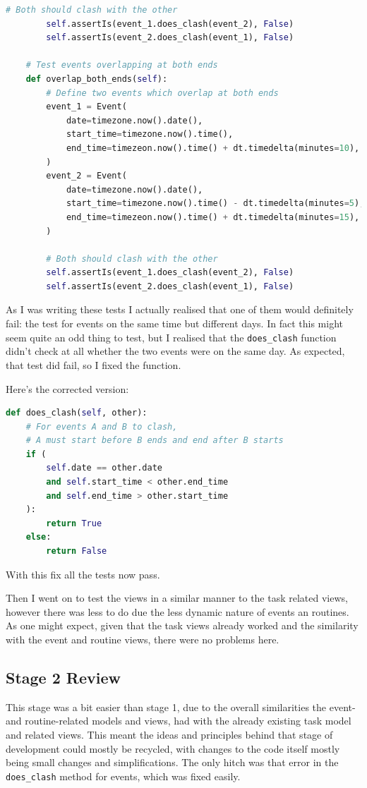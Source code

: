 \documentclass{article}
\begin{document}
\begin{lstlisting}[language=Python]
        # Both should clash with the other
        self.assertIs(event_1.does_clash(event_2), False)
        self.assertIs(event_2.does_clash(event_1), False)

    # Test events overlapping at both ends
    def overlap_both_ends(self):
        # Define two events which overlap at both ends
        event_1 = Event(
            date=timezone.now().date(),
            start_time=timezone.now().time(),
            end_time=timezeon.now().time() + dt.timedelta(minutes=10),
        )
        event_2 = Event(
            date=timezone.now().date(),
            start_time=timezone.now().time() - dt.timedelta(minutes=5),
            end_time=timezeon.now().time() + dt.timedelta(minutes=15),
        )

        # Both should clash with the other
        self.assertIs(event_1.does_clash(event_2), False)
        self.assertIs(event_2.does_clash(event_1), False)
\end{lstlisting}

As I was writing these tests I actually realised that one of them would definitely fail:
the test for events on the same time but different days.
In fact this might seem quite an odd thing to test,
but I realised that the \texttt{does\_clash} function didn't check at all whether the two events were on the same day.
As expected, that test did fail,
so I fixed the function.

Here's the corrected version:
\begin{lstlisting}[language=Python]
def does_clash(self, other):
    # For events A and B to clash,
    # A must start before B ends and end after B starts
    if (
        self.date == other.date
        and self.start_time < other.end_time
        and self.end_time > other.start_time
    ):
        return True
    else:
        return False
\end{lstlisting}

With this fix all the tests now pass.

Then I went on to test the views in a similar manner to the task related views,
however there was less to do due the less dynamic nature of events an routines.
As one might expect,
given that the task views already worked and the similarity with the event and routine views,
there were no problems here.

\subsection{Stage 2 Review}
This stage was a bit easier than stage 1,
due to the overall similarities the event- and routine-related models and views,
had with the already existing task model and related views.
This meant the ideas and principles behind that stage of development could mostly be recycled,
with changes to the code itself mostly being small changes and simplifications.
The only hitch was that error in the \texttt{does\_clash} method for events,
which was fixed easily.
\end{document}
